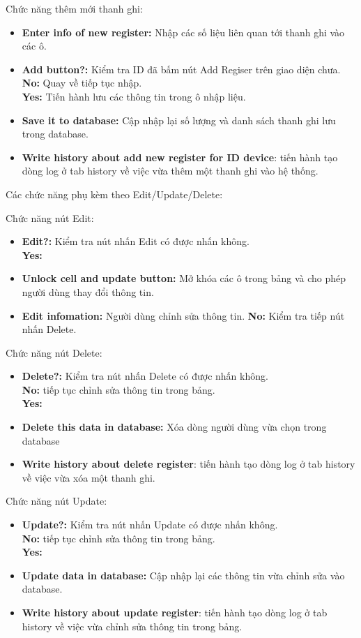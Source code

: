 Chức năng thêm mới thanh ghi:
\begin{itemize}
    \item \textbf{Enter info of new register:} Nhập các số liệu liên quan tới thanh ghi vào các ô.
    \item \textbf{Add button?:} Kiểm tra ID đã bấm nút Add Regiser trên giao diện chưa.\\
    \textbf{No:} Quay về tiếp tục nhập.\\
    \textbf{Yes:} Tiến hành lưu các thông tin trong ô nhập liệu.
    \item \textbf{Save it to database:} Cập nhập lại số lượng và danh sách thanh ghi lưu trong database.
    \item \textbf{Write history about add new register for ID device}: tiến hành tạo dòng log ở tab history về việc vừa thêm một thanh ghi vào hệ thống.
\end{itemize}

Các chức năng phụ kèm theo Edit/Update/Delete:

Chức năng nút Edit:
\begin{itemize}
    \item \textbf{Edit?:} Kiểm tra nút nhấn Edit có được nhấn không.\\
    \textbf{Yes:} 
    \item \textbf{Unlock cell and update button:} Mở khóa các ô trong bảng và cho phép người dùng thay đổi thông tin.
    \item \textbf{Edit infomation:} Người dùng chỉnh sửa thông tin.
    \textbf{No:} Kiểm tra tiếp nút nhấn Delete.
\end{itemize}

Chức năng nút Delete:
\begin{itemize}
    \item \textbf{Delete?:} Kiểm tra nút nhấn Delete có được nhấn không.\\
    \textbf{No:} tiếp tục chỉnh sửa thông tin trong bảng.\\
    \textbf{Yes:} 
    \item \textbf{Delete this data in database:} Xóa dòng người dùng vừa chọn trong database
    \item \textbf{Write history about delete register}: tiến hành tạo dòng log ở tab history về việc vừa xóa một thanh ghi.
\end{itemize}

Chức năng nút Update:
\begin{itemize}
    \item \textbf{Update?:} Kiểm tra nút nhấn Update có được nhấn không.\\
    \textbf{No:} tiếp tục chỉnh sửa thông tin trong bảng.\\
    \textbf{Yes:} 
    \item \textbf{Update data in database:} Cập nhập lại các thông tin vừa chỉnh sửa vào database.
    \item \textbf{Write history about update register}: tiến hành tạo dòng log ở tab history về việc vừa chỉnh sửa thông tin trong bảng.
\end{itemize}

